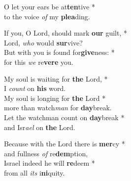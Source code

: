 O let your ears be at\textbf{ten}tive *\\
to the voice \emph{of} my \textbf{plea}ding.

If you, O Lord, should mark \textbf{our} guilt, *\\
Lord, \emph{who} would \textbf{sur}vive?\\
But with you is found for\textbf{give}ness: *\\
for this \emph{we} re\textbf{vere} you.

My soul is waiting for \textbf{the} Lord, *\\
I \emph{count} on \textbf{his} word.\\
My soul is longing for \textbf{the} Lord *\\
more than watch\emph{man} for \textbf{day}break.\\
Let the watchman count on \textbf{day}break *\\
and Isr\emph{ael} on \textbf{the} Lord.

Because with the Lord there is \textbf{mer}cy *\\
and fullness \emph{of} re\textbf{dem}ption,\\
Israel indeed he will \textbf{re}deem *\\
from all \emph{its} i\textbf{ni}quity.
